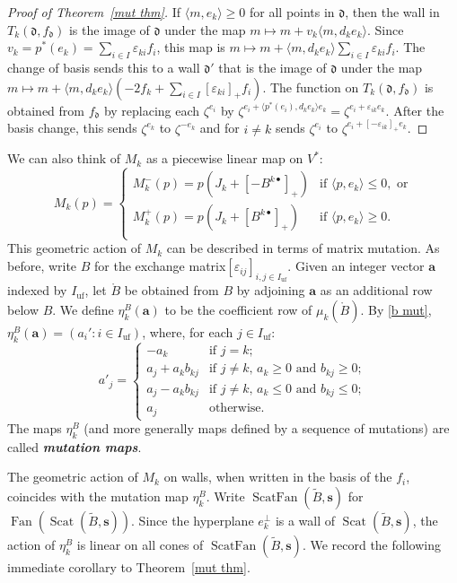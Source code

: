 \documentclass{amsart}
\theoremstyle{definition}
\theoremstyle{remark}
\numberwithin{equation}{section}
\newcommand{\newword}[1]{\textbf{\emph{#1}}}
\newcommand{\ep}{\varepsilon}
\newcommand{\uf}{{\operatorname{uf}}}
\newcommand{\br}[1]{{\langle #1 \rangle}}
\newcommand{\0}{{\mathbf{0}}}
\newcommand{\s}{\mathbf{s}}
\renewcommand{\a}{\mathbf{a}}
\newcommand{\tB}{\tilde{B}}
\newcommand{\Scat}{\operatorname{Scat}}
\newcommand{\Fan}{\operatorname{Fan}}
\newcommand{\ScatFan}{\operatorname{ScatFan}}
\renewcommand{\d}{{\mathfrak d}}
\begin{document}
\begin{proof}[Proof of Theorem~\ref{mut thm}]
If $\br{m,e_k}\ge0$ for all points in $\d$, then the wall in $T_k(\d,f_\d)$ is the image of $\d$ under the map $m\mapsto m+v_k\br{m,d_ke_k}$.
Since $v_k=p^*(e_k)=\sum_{i\in I}\ep_{ki}f_i$, this map is $m\mapsto m+\br{m,d_ke_k}\sum_{i\in I}\ep_{ki}f_i$.
The change of basis sends this to a wall $\d'$ that is the image of $\d$ under the map $m\mapsto m+\br{m,d_ke_k}(-2f_k+\sum_{i\in I}[\ep_{ki}]_+f_i)$.
The function on $T_k(\d,f_\d)$ is obtained from $f_\d$ by replacing each $\zeta^{e_i}$ by $\zeta^{e_i+\br{p^*(e_i),d_ke_k}e_k}=\zeta^{e_i+\ep_{ik}e_k}$.
After the basis change, this sends $\zeta^{e_k}$ to $\zeta^{-e_k}$ and for $i\neq k$ sends $\zeta^{e_i}$ to $\zeta^{e_i+[-\ep_{ik}]_+e_k}$.
\end{proof}

We can also think of $M_k$ as a piecewise linear map on $V^*$:
\begin{equation}
M_k(p)=\begin{cases}
M_k^-(p)=p(J_k+[-B^{k\bullet}]_+)&\text{if }\br{p,e_k}\le0,\text{ or}\\
M_k^+(p)=p(J_k+[B^{k\bullet}]_+)&\text{if }\br{p,e_k}\ge0.\\
\end{cases}
\end{equation}
This geometric action of $M_k$ can be described in terms of matrix mutation.
As before, write $B$ for the exchange matrix${[\ep_{ij}]_{i,j\in I_\uf}}$.
Given an integer vector $\a$ indexed by $I_\uf$, let $\mathring{B}$ be obtained from $B$ by adjoining $\a$ as an additional row below $B$.
We define $\eta_k^B(\a)$ to be the coefficient row of $\mu_k(\mathring{B})$.
By \eqref{b mut}, $\eta_k^B(\a)=(a_i':i\in I_\uf)$, where, for each $j\in I_\uf$:  
\begin{equation}\label{mutation map def}
a'_j=\left\lbrace\begin{array}{ll}
-a_k&\mbox{if }j=k;\\
a_j+a_kb_{kj}&\mbox{if $j\neq k$, $a_k\ge 0$ and $b_{kj}\ge 0$};\\
a_j-a_kb_{kj}&\mbox{if $j\neq k$, $a_k\le 0$ and $b_{kj}\le 0$};\\
a_j&\mbox{otherwise.}
\end{array}\right.
\end{equation}
The maps $\eta_k^B$ (and more generally maps defined by a sequence of mutations) are called \newword{mutation maps}.

The geometric action of $M_k$ on walls, when written in the basis of the $f_i$, coincides with the mutation map $\eta^B_k$.
Write $\ScatFan(\tB,\s)$ for $\Fan(\Scat(\tB,\s))$.
Since the hyperplane $e_k^\perp$ is a wall of $\Scat(\tB,\s)$, the action of $\eta^B_k$ is linear on all cones of $\ScatFan(\tB,\s)$.
We record the following immediate corollary to Theorem~\ref{mut thm}.
\end{document}

